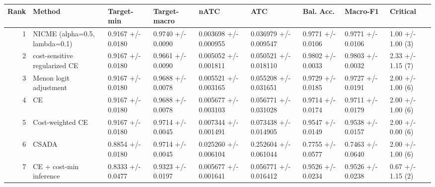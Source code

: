 \begin{tabular}{rllllllll}
\toprule
Rank & Method & Target-min & Target-macro & nATC & ATC & Bal. Acc. & Macro-F1 & Critical \\
\midrule
1 & NICME (alpha=0.5, lambda=0.1) & 0.9167 +/- 0.0180 & 0.9740 +/- 0.0090 & 0.003698 +/- 0.000955 & 0.036979 +/- 0.009547 & 0.9771 +/- 0.0106 & 0.9771 +/- 0.0106 & 1.00 +/- 1.00 (3) \\
2 & cost-sensitive regularized CE & 0.9167 +/- 0.0180 & 0.9661 +/- 0.0090 & 0.005052 +/- 0.001811 & 0.050521 +/- 0.018110 & 0.9802 +/- 0.0033 & 0.9803 +/- 0.0032 & 2.33 +/- 1.15 (7) \\
3 & Menon logit adjustment & 0.9167 +/- 0.0180 & 0.9688 +/- 0.0078 & 0.005521 +/- 0.003165 & 0.055208 +/- 0.031651 & 0.9729 +/- 0.0185 & 0.9727 +/- 0.0191 & 2.00 +/- 1.00 (6) \\
4 & CE & 0.9167 +/- 0.0180 & 0.9688 +/- 0.0078 & 0.005677 +/- 0.003103 & 0.056771 +/- 0.031028 & 0.9714 +/- 0.0174 & 0.9711 +/- 0.0179 & 2.00 +/- 1.00 (6) \\
5 & Cost-weighted CE & 0.9167 +/- 0.0180 & 0.9714 +/- 0.0045 & 0.007344 +/- 0.001491 & 0.073438 +/- 0.014905 & 0.9547 +/- 0.0149 & 0.9538 +/- 0.0157 & 2.00 +/- 0.00 (6) \\
6 & CSADA & 0.8854 +/- 0.0180 & 0.9714 +/- 0.0045 & 0.025260 +/- 0.006104 & 0.252604 +/- 0.061044 & 0.7755 +/- 0.0577 & 0.7463 +/- 0.0640 & 2.00 +/- 1.00 (6) \\
7 & CE + cost-min inference & 0.8333 +/- 0.0477 & 0.9323 +/- 0.0197 & 0.005677 +/- 0.001641 & 0.056771 +/- 0.016412 & 0.9526 +/- 0.0234 & 0.9526 +/- 0.0238 & 0.67 +/- 1.15 (2) \\
\bottomrule
\end{tabular}
